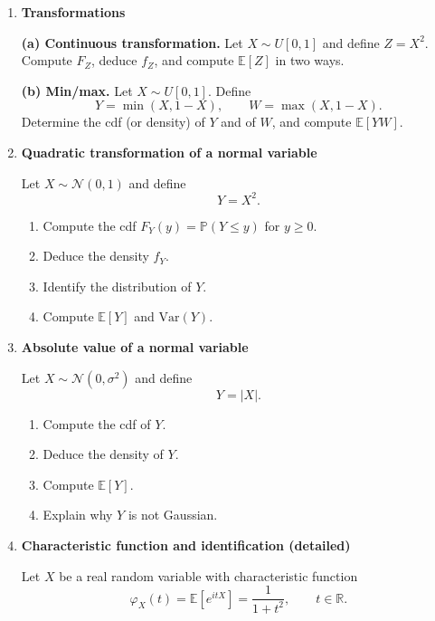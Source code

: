 \documentclass[11pt]{article}
\begin{document}
\begin{enumerate}[leftmargin=*, itemsep=1.2em]
\bigskip

\item \textbf{Transformations}

\textbf{(a) Continuous transformation.}
Let $X\sim U[0,1]$ and define $Z=X^2$.
Compute $F_Z$, deduce $f_Z$, and compute $\mathbb{E}[Z]$ in two ways.

\medskip
\textbf{(b) Min/max.}
Let $X\sim U[0,1]$. Define
\[
Y=\min(X,1-X),\qquad W=\max(X,1-X).
\]
Determine the cdf (or density) of $Y$ and of $W$, and compute $\mathbb{E}[YW]$.

\bigskip

\bigskip

\item \textbf{Quadratic transformation of a normal variable}

Let $X\sim \mathcal{N}(0,1)$ and define
\[
Y = X^2.
\]

\begin{enumerate}[label=(\alph*)]
\item Compute the cdf $F_Y(y)=\mathbb{P}(Y\le y)$ for $y\ge0$.
\item Deduce the density $f_Y$.
\item Identify the distribution of $Y$.
\item Compute $\mathbb{E}[Y]$ and $\mathrm{Var}(Y)$.
\end{enumerate}

\bigskip

\item \textbf{Absolute value of a normal variable}

Let $X\sim\mathcal{N}(0,\sigma^2)$ and define
\[
Y=|X|.
\]

\begin{enumerate}[label=(\alph*)]
\item Compute the cdf of $Y$.
\item Deduce the density of $Y$.
\item Compute $\mathbb{E}[Y]$.
\item Explain why $Y$ is not Gaussian.
\end{enumerate}

\bigskip

\item \textbf{Characteristic function and identification (detailed)}

Let $X$ be a real random variable with characteristic function
\[
\varphi_X(t)=\mathbb{E}\!\left[e^{itX}\right]=\frac{1}{1+t^2},\qquad t\in\mathbb{R}.
\]


\end{enumerate}
\end{document}
